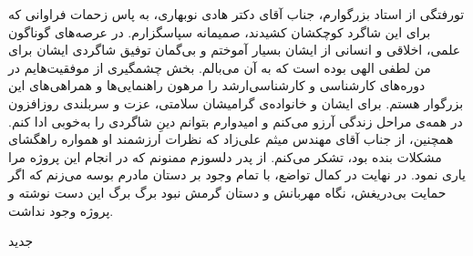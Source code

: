 


\begin{center}
\end{center}

‌تورفتگی 
از استاد بزرگوارم، جناب آقای دکتر هادی نوبهاری، به پاس زحمات فراوانی که برای این شاگرد کوچکشان کشیدند، صمیمانه سپاسگزارم. در عرصه‌های گوناگون علمی، اخلاقی و انسانی از ایشان بسیار آموختم و بی‌گمان توفیق شاگردی ایشان برای من لطفی الهی بوده است که به آن می‌بالم. بخش چشمگیری از موفقیت‌هایم در دوره‌های کارشناسی و کارشناسی‌ارشد را مرهون راهنمایی‌ها و همراهی‌های این بزرگوار هستم. برای ایشان و خانواده‌ی گرامیشان سلامتی، عزت و سربلندی روزافزون در همه‌ی مراحل زندگی آرزو می‌کنم و امیدوارم بتوانم دینِ شاگردی را به‌خوبی ادا کنم.
همچنین، از جناب آقای مهندس میثم علی‌زاد که نظرات ارزشمند او همواره راهگشای مشکلات بنده بود، تشکر می‌کنم.
از پدر دلسوزم ممنونم که در انجام این پروژه مرا یاری نمود. در نهایت در کمال تواضع، با تمام وجود بر دستان مادرم بوسه می‌زنم که اگر حمایت بی‌دریغش، نگاه مهربانش و دستان گرمش نبود برگ برگ این دست نوشته و پروژه وجود نداشت.

‌جدید
